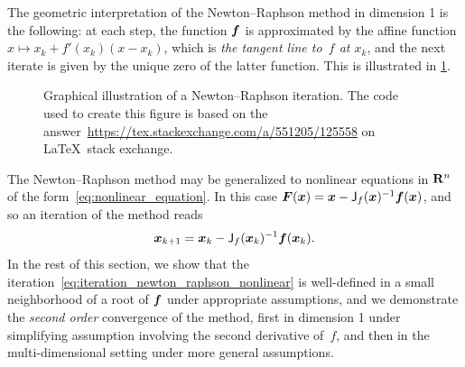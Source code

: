 The geometric interpretation of the Newton--Raphson method in dimension 1 is the following:
at each step, the function $\mathbf{\boldsymbol{f}}$ is approximated by the affine function
$x \mapsto x_k + f'(x_k)(x - x_k)$,
which is \emph{the tangent line to~$f$ at $x_k$},
and the next iterate is given by the unique zero of the latter function.
This is illustrated in \cref{fig:newton_raphson}.
\begin{figure}[ht]
    \centering
    \caption{%
        Graphical illustration of a Newton--Raphson iteration.
        {\footnotesize The code used to create this figure is based on the answer~\url{https://tex.stackexchange.com/a/551205/125558} on \LaTeX~stack exchange}.
    }%
    \label{fig:newton_raphson}
\end{figure}

The Newton--Raphson method may be generalized to nonlinear equations in $\mathbf R^n$ of the form~\eqref{eq:nonlinear_equation}.
In this case $\mathbf{\boldsymbol{F}}(\mathbf{\boldsymbol{x}}) = \mathbf{\boldsymbol{x}} - \mathsf J_f(\mathbf{\boldsymbol{x}})^{-1} \mathbf{\boldsymbol{f}}(\mathbf{\boldsymbol{x}})$,
and so an iteration of the method reads
\begin{equation}
    \label{eq:iteration_newton_raphson_nonlinear}
    \mathbf{\boldsymbol{x}}_{k+1} = \mathbf{\boldsymbol{x}}_k - \mathsf J_f(\mathbf{\boldsymbol{x}}_k)^{-1} \mathbf{\boldsymbol{f}}(\mathbf{\boldsymbol{x}}_k).
\end{equation}
In the rest of this section,
we show that the iteration~\eqref{eq:iteration_newton_raphson_nonlinear} is well-defined in a small neighborhood of a root of $\mathbf{\boldsymbol{f}}$ under appropriate assumptions,
and we demonstrate the \emph{second order} convergence of the method,
first in dimension 1 under simplifying assumption involving the second derivative of~$f$,
and then in the multi-dimensional setting under more general assumptions.

